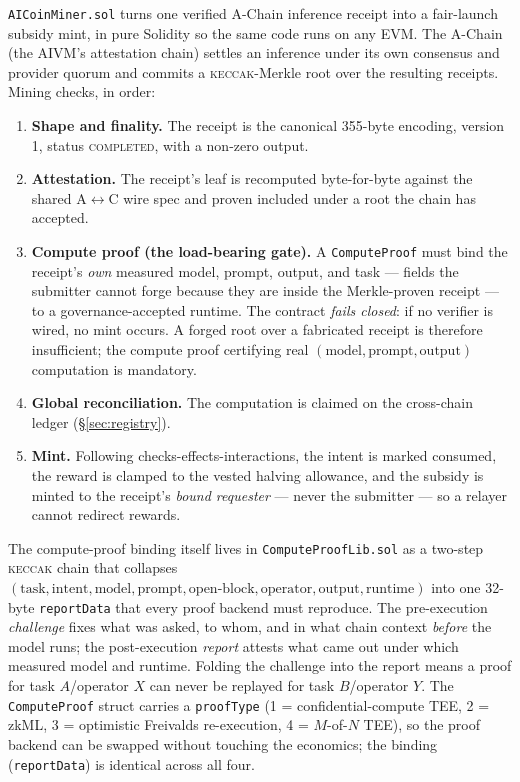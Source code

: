 \documentclass[11pt,a4paper]{article}
\begin{document}
\texttt{AICoinMiner.sol} turns one verified A-Chain inference receipt into a fair-launch subsidy mint, in pure Solidity so the same code runs on any EVM. The A-Chain (the AIVM's attestation chain) settles an inference under its own consensus and provider quorum and commits a \textsc{keccak}-Merkle root over the resulting receipts. Mining checks, in order:
\begin{enumerate}
  \item \textbf{Shape and finality.} The receipt is the canonical 355-byte encoding, version 1, status \textsc{completed}, with a non-zero output.
  \item \textbf{Attestation.} The receipt's leaf is recomputed byte-for-byte against the shared A$\leftrightarrow$C wire spec and proven included under a root the chain has accepted.
  \item \textbf{Compute proof (the load-bearing gate).} A \texttt{ComputeProof} must bind the receipt's \emph{own} measured model, prompt, output, and task --- fields the submitter cannot forge because they are inside the Merkle-proven receipt --- to a governance-accepted runtime. The contract \emph{fails closed}: if no verifier is wired, no mint occurs. A forged root over a fabricated receipt is therefore insufficient; the compute proof certifying real $(\text{model},\text{prompt},\text{output})$ computation is mandatory.
  \item \textbf{Global reconciliation.} The computation is claimed on the cross-chain ledger (\S\ref{sec:registry}).
  \item \textbf{Mint.} Following checks-effects-interactions, the intent is marked consumed, the reward is clamped to the vested halving allowance, and the subsidy is minted to the receipt's \emph{bound requester} --- never the submitter --- so a relayer cannot redirect rewards.
\end{enumerate}

The compute-proof binding itself lives in \texttt{ComputeProofLib.sol} as a two-step \textsc{keccak} chain that collapses $(\text{task},\text{intent},\text{model},\text{prompt},\text{open-block},\text{operator},\text{output},\text{runtime})$ into one 32-byte \texttt{reportData} that every proof backend must reproduce. The pre-execution \emph{challenge} fixes what was asked, to whom, and in what chain context \emph{before} the model runs; the post-execution \emph{report} attests what came out under which measured model and runtime. Folding the challenge into the report means a proof for task $A$/operator $X$ can never be replayed for task $B$/operator $Y$. The \texttt{ComputeProof} struct carries a \texttt{proofType} (1 = confidential-compute TEE, 2 = zkML, 3 = optimistic Freivalds re-execution, 4 = $M$-of-$N$ TEE), so the proof backend can be swapped without touching the economics; the binding (\texttt{reportData}) is identical across all four.
\end{document}
